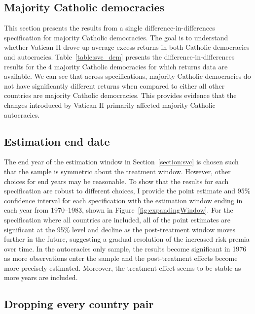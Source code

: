 

\subsection{Majority Catholic democracies}\label{section:maj_cath_dem}

This section presents the results from a single difference-in-differences specification for majority Catholic democracies. The goal is to understand whether Vatican II drove up average excess returns in both Catholic democracies and autocracies. Table~\ref{table:svc_dem} presents the difference-in-differences results for the 4 majority Catholic democracies for which returns data are available.  We can see that across specifications, majority Catholic democracies do not have significantly different returns when compared to either all other countries are majority Catholic democracies. This provides evidence that the changes introduced by Vatican II primarily affected majority Catholic autocracies.



\subsection{Estimation end date}\label{section:estimationEnd}

The end year of the estimation window in Section~\ref{section:svc} is chosen such that the sample is symmetric about the treatment window. However, other choices for end years may be reasonable. To show that the results for each specification are robust to different choices, I provide the point estimate and 95\% confidence interval for each specification with the estimation window ending in each year from 1970--1983, shown in Figure~\ref{fig:expandingWindow}. For the specification where all countries are included, all of the point estimates are significant at the 95\% level and decline as the post-treatment window moves further in the future, suggesting a gradual resolution of the increased risk premia over time. In the autocracies only sample, the results become significant in 1976 as more observations enter the sample and the post-treatment effects become more precisely estimated. Moreover, the treatment effect seems to be stable as more years are included.



\subsection{Dropping every country pair}\label{section:excludingCountries}

